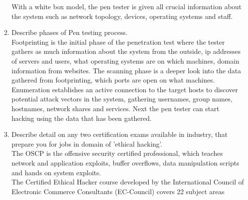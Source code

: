 \begin{enumerate}
    With a white box model, the pen tester is given all crucial information about the system such as network topology, devices, operating systems and staff. 
    \item Describe phases of Pen testing process.\\
    Footprinting is the initial phase of the penetration test where the tester gathers as much information about the system from the outside, ip addresses of servers and users, what operating systems are on which machines, domain information from websites.
    The scanning phase is a deeper look into the data gathered from footprinting, which ports are open on what machines.
    Enumeration establishes an active connection to the target hosts to discover potential attack vectors in the system, gathering usernames, group names, hostnames, network shares and services.
    Next the pen tester can start hacking using the data that has been gathered.
    \item Describe detail on any two certification exams available in industry, that prepare you for jobs in domain of 'ethical hacking'.\\
    The OSCP is the offensive security certified professional, which teaches network and application exploits, buffer overflows, data manipulation scripts and hands on system exploits.\\
    The Certified Ethical Hacker course developed by the International Council of Electronic Commerce Consultants (EC-Council) covers 22 subject areas 
\end{enumerate}